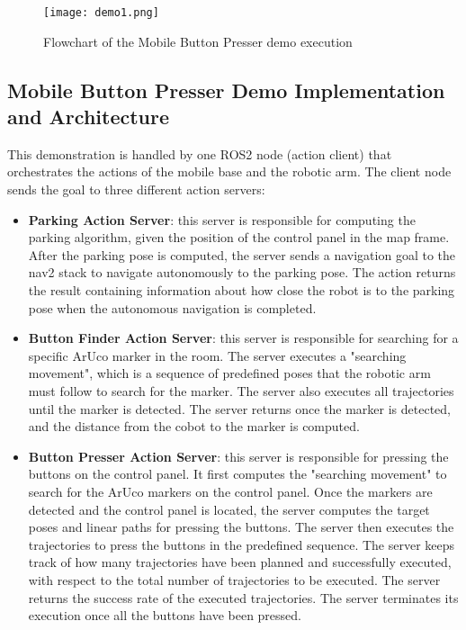 \begin{figure}[t]
    \centering
    \texttt{[image: demo1.png]}
    \caption{Flowchart of the Mobile Button Presser demo execution}
    \label{mbp_flowchart}
\end{figure}

\subsection{Mobile Button Presser Demo Implementation and Architecture}
\label{sec:demo1}

This demonstration is handled by one ROS2 node (action client) that orchestrates the actions of the mobile base
and the robotic arm. The client node sends the goal to three different action servers:

\begin{itemize}
    \item \textbf{Parking Action Server}: this server is responsible for computing the parking algorithm, given the
    position of the control panel in the map frame. After the parking pose is computed, the server sends a navigation
    goal to the nav2 stack to navigate autonomously to the parking pose. The action returns the result containing
    information about how close the robot is to the parking pose when the autonomous navigation is completed.
    \item \textbf{Button Finder Action Server}: this server is responsible for searching for a specific ArUco marker
    in the room. The server executes a "searching movement", which is a sequence of predefined poses that the robotic arm
    must follow to search for the marker. The server also executes all trajectories until the marker is detected.
    The server returns once the marker is detected, and the distance from the cobot to the marker is computed.
    \item \textbf{Button Presser Action Server}: this server is responsible for pressing the buttons on the control panel.
    It first computes the "searching movement" to search for the ArUco markers on the control panel.
    Once the markers are detected and the control panel is located, the server computes the target poses and linear paths
    for pressing the buttons. The server then executes the trajectories to press the buttons in the predefined sequence.
    The server keeps track of how many trajectories have been planned and successfully executed, with respect to
    the total number of trajectories to be executed. The server returns the success rate of the executed trajectories.
    The server terminates its execution once all the buttons have been pressed.
\end{itemize}

